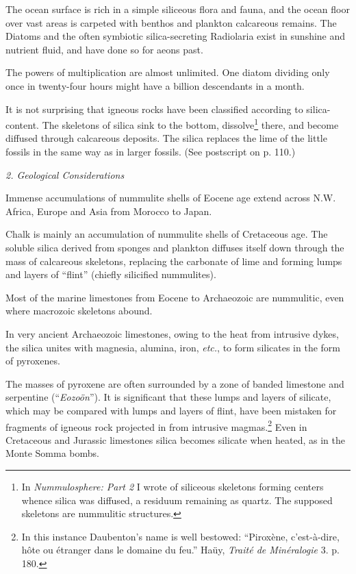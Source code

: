\documentclass[a4paper, 12pt, oneside, landscape]{article}
\begin{document}
The ocean surface is rich in a simple siliceous flora and fauna, and the ocean floor over vast areas is carpeted with benthos and plankton calcareous remains. The Diatoms and the often symbiotic silica-secreting Radiolaria exist in sunshine and nutrient fluid, and have done so for aeons past.

The powers of multiplication are almost unlimited. One diatom dividing only once in twenty-four hours might have a billion descendants in a month.

It is not surprising that igneous rocks have been classified according to silica-content. The skeletons of silica sink to the bottom, dissolve\footnote{In \emph{Nummulosphere: Part 2} I wrote of siliceous skeletons forming centers whence silica was diffused, a residuum remaining as quartz. The supposed skeletons are nummulitic structures.} there, and become diffused through calcareous deposits. The silica replaces the lime of the little fossils in the same way as in larger fossils. (See postscript on p. 110.)

\bigskip
\centerline{\emph{2. Geological Considerations}}

Immense accumulations of nummulite shells of Eocene age extend across N.W. Africa, Europe and Asia from Morocco to Japan.

Chalk is mainly an accumulation of nummulite shells of Cretaceous age. The soluble silica derived from sponges and plankton diffuses itself down through the mass of calcareous skeletons, replacing the carbonate of lime and forming lumps and layers of ``flint'' (chiefly silicified nummulites).

Most of the marine limestones from Eocene to Archaeozoic are nummulitic, even where macrozoic skeletons abound.

In very ancient Archaeozoic limestones, owing to the heat from intrusive dykes, the silica unites with magnesia, alumina, iron, \emph{etc.}, to form silicates in the form of pyroxenes.

The masses of pyroxene are often surrounded by a zone of banded limestone and serpentine (``\emph{Eozoön}''). It is significant that these lumps and layers of silicate, which may be compared with lumps and layers of flint, have been mistaken for fragments of igneous rock projected in from intrusive magmas.\footnote{In this instance Daubenton's name is well bestowed: ``Piroxène, c'est-à-dire, hôte ou étranger dans le domaine du feu.'' Haüy, \emph{Traité de Minéralogie} 3. p. 180.} Even in Cretaceous and Jurassic limestones silica becomes silicate when heated, as in the Monte Somma bombs.
\end{document}

